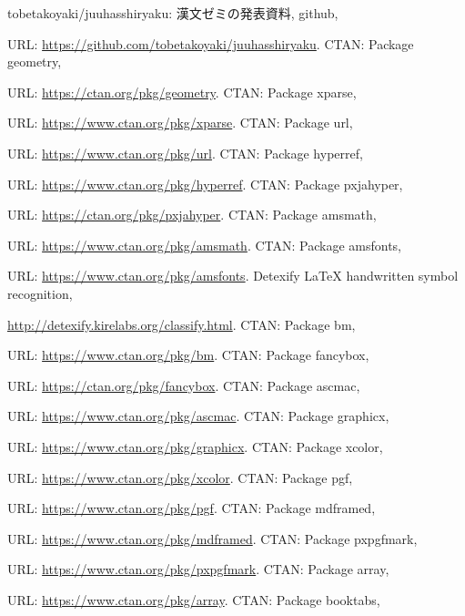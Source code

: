 \documentclass[uplatex]{jsreport}
\begin{document}
\begin{thebibliography}{99}
   tobetakoyaki/juuhasshiryaku: 漢文ゼミの発表資料, github,\par
  URL: \url{https://github.com/tobetakoyaki/juuhasshiryaku}.
   CTAN: Package geometry, \par
  URL: \url{https://ctan.org/pkg/geometry}.
   CTAN: Package xparse, \par
  URL: \url{https://www.ctan.org/pkg/xparse}.
   CTAN: Package url, \par
  URL: \url{https://www.ctan.org/pkg/url}.
   CTAN: Package hyperref, \par
  URL: \url{https://www.ctan.org/pkg/hyperref}.
   CTAN: Package pxjahyper, \par
  URL: \url{https://ctan.org/pkg/pxjahyper}.
   CTAN: Package amsmath, \par
  URL: \url{https://www.ctan.org/pkg/amsmath}.
   CTAN: Package amsfonts, \par
  URL: \url{https://www.ctan.org/pkg/amsfonts}.
   Detexify LaTeX handwritten symbol recognition, \par
  \url{http://detexify.kirelabs.org/classify.html}.
   CTAN: Package bm, \par
  URL: \url{https://www.ctan.org/pkg/bm}.
   CTAN: Package fancybox, \par
  URL: \url{https://ctan.org/pkg/fancybox}.
   CTAN: Package ascmac, \par
  URL: \url{https://www.ctan.org/pkg/ascmac}.
   CTAN: Package graphicx, \par
  URL: \url{https://www.ctan.org/pkg/graphicx}.
   CTAN: Package xcolor, \par
  URL: \url{https://www.ctan.org/pkg/xcolor}.
   CTAN: Package pgf, \par
  URL: \url{https://www.ctan.org/pkg/pgf}.
   CTAN: Package mdframed, \par
  URL: \url{https://www.ctan.org/pkg/mdframed}.
   CTAN: Package pxpgfmark, \par
  URL: \url{https://www.ctan.org/pkg/pxpgfmark}.
   CTAN: Package array, \par
  URL: \url{https://www.ctan.org/pkg/array}.
   CTAN: Package booktabs, \par

\end{thebibliography}
\end{document}
